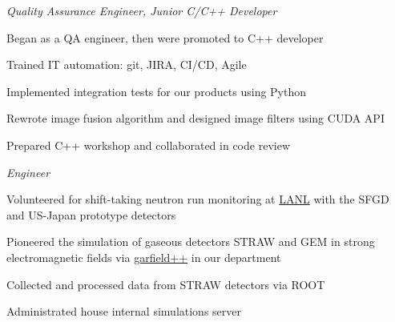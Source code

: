 \documentclass[
  a4paper, 
   maincolor=cvblue,
   sectioncolor=cvblue,
]{fortysecondscv}
\begin{document}





\newpage
\restoregeometry
{}\paperwidth

\makefrontsidebar

\begin{cvtable}
	{\textit{Quality Assurance Engineer, Junior C/C++ Developer}
	\normalsize 
	\begin{itemize-noindent}
		\item Began as a QA engineer, then were promoted to C++ developer
		\item Trained IT automation: git, JIRA, CI/CD, Agile
		\item Implemented integration tests for our products using Python
		\item Rewrote image fusion algorithm and designed image filters using CUDA API
		\item Prepared C++ workshop and collaborated in code review
	\end{itemize-noindent}
	}
	
	{\textit{Engineer}
	\normalsize 
	\begin{itemize-noindent}
		\item Volunteered for shift-taking neutron run monitoring at \href{https://www.lanl.gov}{LANL} with the SFGD and US-Japan prototype detectors
		\item Pioneered the simulation of gaseous detectors STRAW and GEM in strong electromagnetic fields via \href{https://garfieldpp.web.cern.ch/garfieldpp/}{garfield++} in our department
		\item Collected and processed data from STRAW detectors via ROOT
		\item Administrated house internal simulations server %
	\end{itemize-noindent}
	}
	

\end{cvtable}
\end{document}
